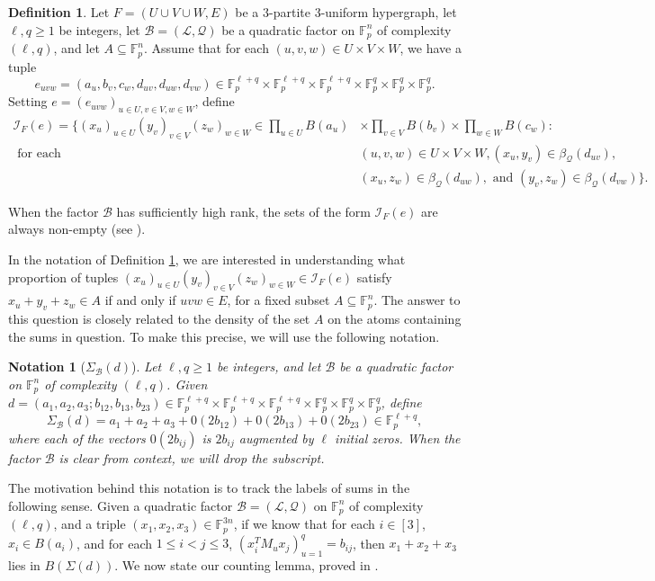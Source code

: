 \documentclass[12pt,oneside,british,a4wide]{amsart}
\newtheorem{notation}[theorem]{Notation}
\numberwithin{equation}{section}
\theoremstyle{definition}
\newtheorem{definition}[theorem]{Definition}
\def\F{\mathbb{F}}
\newcommand{\calL}{\mathcal{L}}
\newcommand{\calB}{\mathcal{B}}
\newcommand{\calI}{\mathcal{I}}
\newcommand{\calQ}{\mathcal{Q}}
\begin{document}
\begin{definition}\label{def:if}
Let $F=(U\cup V\cup W,E)$ be a $3$-partite $3$-uniform hypergraph, let $\ell,q\geq 1$ be integers, let $\calB=(\calL,\calQ)$ be a quadratic factor on $\F_p^n$ of complexity $(\ell,q)$, and let $A\subseteq \F_p^n$.  Assume  that for each $(u,v,w)\in U\times V
\times W$,  we have a tuple 
$$
e_{uvw}=(a_u,b_v,c_w,d_{uv},d_{uw},d_{vw})\in \F_p^{\ell+q}\times \F_p^{\ell+q}\times \F_p^{\ell+q}\times \F_p^q\times \F_p^q\times \F_p^q.
$$
Setting $e=(e_{uvw})_{u\in U, v\in V, w\in W }$, define
\begin{align*}
\calI_F(e)=\{(x_u)_{u\in U}(y_v)_{v\in V}(z_w)_{w\in W}\in  \prod_{u\in U}B(a_u)&\times\prod_{v\in V}B(b_v)\times\prod_{w\in W}B(c_w):\\
 \text{ for each }&(u,v,w)\in U\times V\times W,
(x_u,y_v)\in \beta_{\calQ}(d_{uv}), \\
&(x_u,z_w)\in \beta_{\calQ}(d_{uw}), \text{ and }(y_v,z_w)\in \beta_{\calQ}(d_{vw})\}.
\end{align*}
\end{definition}

When the factor $\calB$ has sufficiently high rank, the sets of the form $\calI_F(e)$ are always non-empty (see \cite[Lemma D.8]{Terry.2021d}). 

In the notation of Definition \ref{def:if}, we are interested in understanding what proportion of tuples $(x_u)_{u\in U}(y_v)_{v\in V}(z_w)_{w\in W}\in \calI_F(e)$ satisfy $ x_u+y_v+z_w\in A$ if and only if $uvw\in E$, for a fixed subset $A\subseteq \F_p^n$.  The answer to this question is closely related to the density of the set $A$ on the atoms containing the sums in question.  To make this precise, we will use the following notation.

\begin{notation}[$\Sigma_{\calB}(d)$]\label{not:sigmad}
Let $\ell,q\geq 1$ be integers, and let $\calB$ be a quadratic factor on $\F_p^n$ of complexity $(\ell,q)$. Given $d=(a_1,a_2,a_3;b_{12},b_{13},b_{23})\in \mathbb{F}_p^{\ell+q}\times  \mathbb{F}_p^{\ell+q}\times  \mathbb{F}_p^{\ell+q}\times  \mathbb{F}_p^{q}\times  \mathbb{F}_p^{q}\times  \mathbb{F}_p^q$, define
$$ 
\Sigma_{\calB}(d)=a_1+a_2+a_3+0(2b_{12})+0(2b_{13})+0(2b_{23})\in \F_p^{\ell+q},
$$
 where each of the vectors $0(2b_{ij})$ is $2b_{ij}$ augmented by $\ell$ initial zeros. When the factor $\calB$ is clear from context, we will drop the subscript.
\end{notation}

The motivation behind this notation is to track the labels of sums in the following sense.  Given a quadratic factor $\calB=(\calL,\calQ)$ on $\F_p^n$ of complexity $(\ell,q)$, and a triple $(x_1,x_2,x_3)\in \F_p^{3n}$, if we know that for each $i\in [3]$, $x_i\in B(a_i)$, and for each $1\leq i<j\leq 3$, $(x_i^TM_u x_j)_{u=1}^q=b_{ij}$, then $x_1+x_2+x_3$ lies in $B(\Sigma(d))$.    We now state our counting lemma, proved in \cite[Proposition D.11]{Terry.2021d}.
\end{document}
